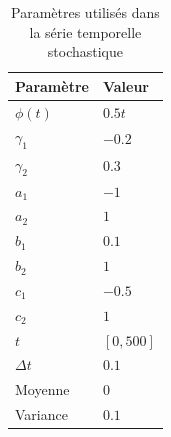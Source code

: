 \begin{table}[H]
\centering
\begin{tabular}{|l|l|}
  \hline
  Paramètre       & Valeur \\\hline
  $\phi(t)$       & $0.5t$ \\
  $\gamma_1$      & $-0.2$ \\
  $\gamma_2$      & $0.3$ \\
  $a_1$           & $-1$ \\
  $a_2$           & $1$ \\
  $b_1$           & $0.1$ \\
  $b_2$           & $1$ \\
  $c_1$           & $-0.5$ \\
  $c_2$           & $1$ \\
  $t$             & $[0, 500]$ \\
  $\Delta t$      & $0.1$ \\
  Moyenne         & $0$ \\
  Variance        & $0.1$ \\\hline
\end{tabular}
\caption{Paramètres utilisés dans la série temporelle stochastique}
\label{tab:stochastic-parameters}
\end{table}
